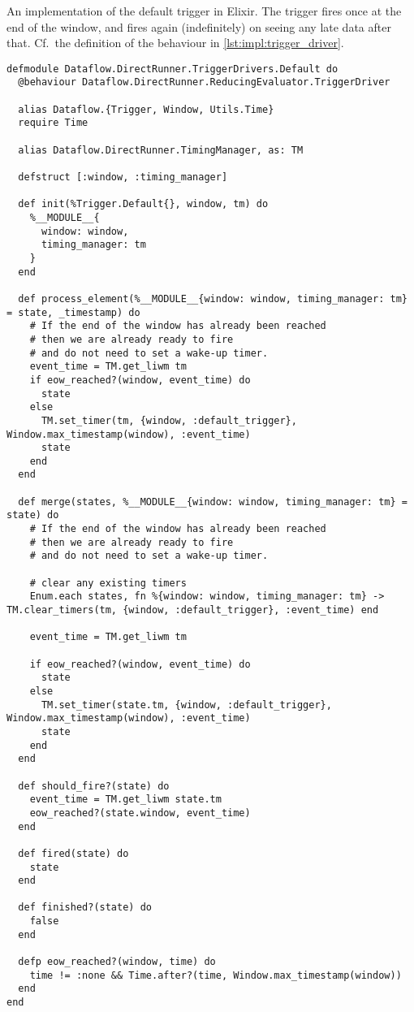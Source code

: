 \begin{codelisting}
	\caption[An implementation of the default trigger as a FSM in Elixir.]{An implementation of the default trigger in Elixir. The trigger fires once at the end of the window, and fires again (indefinitely) on seeing any late data after that. Cf.\ the definition of the  behaviour in \cref{lst:impl:trigger_driver}.}
	\label{lst:apx:additional:default-trigger}
	\begin{verbatim}
defmodule Dataflow.DirectRunner.TriggerDrivers.Default do
  @behaviour Dataflow.DirectRunner.ReducingEvaluator.TriggerDriver

  alias Dataflow.{Trigger, Window, Utils.Time}
  require Time

  alias Dataflow.DirectRunner.TimingManager, as: TM

  defstruct [:window, :timing_manager]

  def init(%Trigger.Default{}, window, tm) do
    %__MODULE__{
      window: window,
      timing_manager: tm
    }
  end

  def process_element(%__MODULE__{window: window, timing_manager: tm} = state, _timestamp) do
    # If the end of the window has already been reached
    # then we are already ready to fire
    # and do not need to set a wake-up timer.
    event_time = TM.get_liwm tm
    if eow_reached?(window, event_time) do
      state
    else
      TM.set_timer(tm, {window, :default_trigger}, Window.max_timestamp(window), :event_time)
      state
    end
  end

  def merge(states, %__MODULE__{window: window, timing_manager: tm} = state) do
    # If the end of the window has already been reached
    # then we are already ready to fire
    # and do not need to set a wake-up timer.

    # clear any existing timers
    Enum.each states, fn %{window: window, timing_manager: tm} -> TM.clear_timers(tm, {window, :default_trigger}, :event_time) end

    event_time = TM.get_liwm tm

    if eow_reached?(window, event_time) do
      state
    else
      TM.set_timer(state.tm, {window, :default_trigger}, Window.max_timestamp(window), :event_time)
      state
    end
  end

  def should_fire?(state) do
    event_time = TM.get_liwm state.tm
    eow_reached?(state.window, event_time)
  end

  def fired(state) do
    state
  end

  def finished?(state) do
    false
  end

  defp eow_reached?(window, time) do
    time != :none && Time.after?(time, Window.max_timestamp(window))
  end
end
	\end{verbatim}

\end{codelisting}
